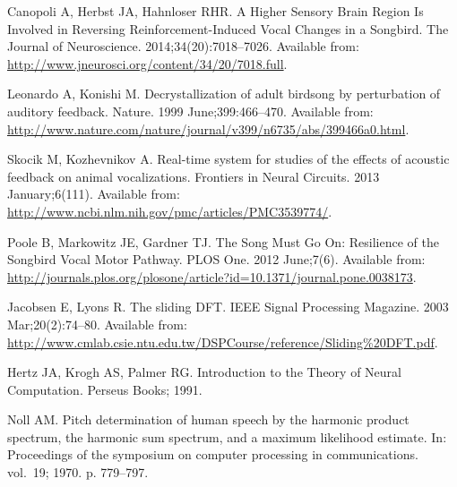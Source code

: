 \documentclass[10pt,letterpaper]{article}
\begin{document}
\begin{thebibliography}{10}
Canopoli A, Herbst JA, Hahnloser RHR.
\newblock A Higher Sensory Brain Region Is Involved in Reversing
  Reinforcement-Induced Vocal Changes in a Songbird.
\newblock The Journal of Neuroscience. 2014;34(20):7018--7026.
\newblock Available from:
  \url{http://www.jneurosci.org/content/34/20/7018.full}.

Leonardo A, Konishi M.
\newblock Decrystallization of adult birdsong by perturbation of auditory
  feedback.
\newblock Nature. 1999 June;399:466--470.
\newblock Available from:
  \url{http://www.nature.com/nature/journal/v399/n6735/abs/399466a0.html}.

Skocik M, Kozhevnikov A.
\newblock Real-time system for studies of the effects of acoustic feedback on
  animal vocalizations.
\newblock Frontiers in Neural Circuits. 2013 January;6(111).
\newblock Available from:
  \url{http://www.ncbi.nlm.nih.gov/pmc/articles/PMC3539774/}.

Poole B, Markowitz JE, Gardner TJ.
\newblock The Song Must Go On: Resilience of the Songbird Vocal Motor Pathway.
\newblock PLOS One. 2012 June;7(6).
\newblock Available from:
  \url{http://journals.plos.org/plosone/article?id=10.1371/journal.pone.0038173}.

Jacobsen E, Lyons R.
\newblock The sliding DFT.
\newblock IEEE Signal Processing Magazine. 2003 Mar;20(2):74--80.
\newblock Available from:
  \url{http://www.cmlab.csie.ntu.edu.tw/DSPCourse/reference/Sliding\%20DFT.pdf}.

Hertz JA, Krogh AS, Palmer RG.
\newblock Introduction to the Theory of Neural Computation.
\newblock Perseus Books; 1991.

Noll AM.
\newblock Pitch determination of human speech by the harmonic product spectrum,
  the harmonic sum spectrum, and a maximum likelihood estimate.
\newblock In: Proceedings of the symposium on computer processing in
  communications. vol.~19; 1970. p. 779--797.

\end{thebibliography}
\end{document}

